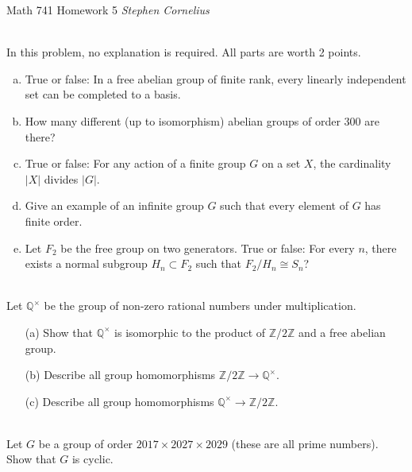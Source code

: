 \documentclass{article}
\def\zz{{\mathbb Z}}
\def\qq{{\mathbb Q}}
\begin{document}
\begin{center}
    Math 741
    \hfill Homework 5
    \hfill \textit{Stephen Cornelius}
\end{center}



\begin{problem} \\
    In this problem, no explanation is required. All parts are worth 2 points.
    \begin{enumerate}[(a)]
        \item True or false: In a free abelian group of finite rank, every linearly independent set can be completed to a basis.
        \item How many different (up to isomorphism) abelian groups of order $300$ are there?
        \item True or false: For any action of a finite group $G$ on a set $X$, the cardinality $|X|$ divides $|G|$.
        \item Give an example of an infinite group $G$ such that every element of $G$ has finite order.
        \item Let $F_2$ be the free group on two generators. True or false: For every $n$, there exists a normal subgroup $H_n \subset F_2$ such that $F_2/H_n \cong S_n$?
    \end{enumerate}
\end{problem}


\begin{problem} \\
    Let $\qq^\times$ be the group of non-zero rational numbers under multiplication.
    \begin{enumerate}
        \item[(a)] Show that $\qq^\times$ is isomorphic to the product of $\zz/2\zz$ and a free abelian group. %
        \item[(b)] Describe all group homomorphisms $\zz/2\zz \to \qq^\times$. %
        \item[(c)] Describe all group homomorphisms $\qq^\times \to \zz/2\zz$. %
    \end{enumerate}

\end{problem}


\begin{problem} \\
    Let $G$ be a group of order $2017 \times 2027 \times 2029$ (these are all prime numbers). Show that $G$ is cyclic.
\end{problem}
\end{document}
